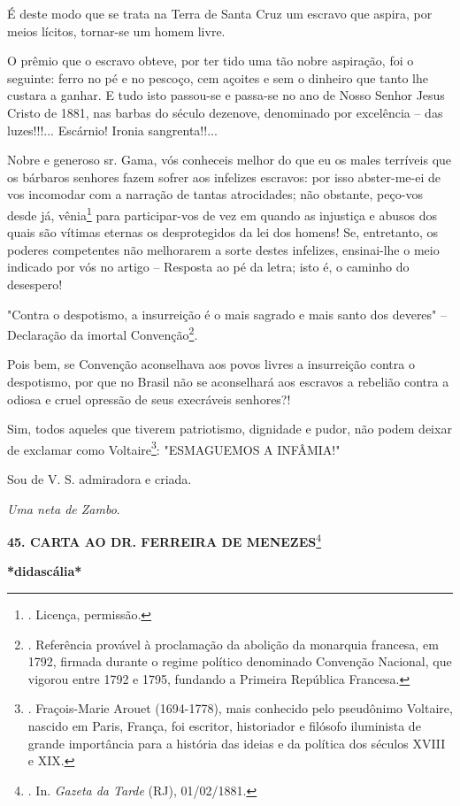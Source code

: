 É deste modo que se trata na Terra de Santa Cruz um escravo que aspira,
por meios lícitos, tornar-se um homem livre.

O prêmio que o escravo obteve, por ter tido uma tão nobre aspiração, foi
o seguinte: ferro no pé e no pescoço, cem açoites e sem o dinheiro que
tanto lhe custara a ganhar. E tudo isto passou-se e passa-se no ano de
Nosso Senhor Jesus Cristo de 1881, nas barbas do século dezenove,
denominado por excelência -- das luzes!!!... Escárnio! Ironia
sangrenta!!...

Nobre e generoso sr. Gama, vós conheceis melhor do que eu os males
terríveis que os bárbaros senhores fazem sofrer aos infelizes escravos:
por isso abster-me-ei de vos incomodar com a narração de tantas
atrocidades; não obstante, peço-vos desde já, vênia\footnote{. Licença,
  permissão.} para participar-vos de vez em quando as injustiça e abusos
dos quais são vítimas eternas os desprotegidos da lei dos homens! Se,
entretanto, os poderes competentes não melhorarem a sorte destes
infelizes, ensinai-lhe o meio indicado por vós no artigo -- Resposta ao
pé da letra; isto é, o caminho do desespero!

"Contra o despotismo, a insurreição é o mais sagrado e mais santo dos
deveres" -- Declaração da imortal Convenção\footnote{. Referência
  provável à proclamação da abolição da monarquia francesa, em 1792,
  firmada durante o regime político denominado Convenção Nacional, que
  vigorou entre 1792 e 1795, fundando a Primeira República Francesa.}.

Pois bem, se Convenção aconselhava aos povos livres a insurreição contra
o despotismo, por que no Brasil não se aconselhará aos escravos a
rebelião contra a odiosa e cruel opressão de seus execráveis senhores?!

Sim, todos aqueles que tiverem patriotismo, dignidade e pudor, não podem
deixar de exclamar como Voltaire\footnote{. Fraçois-Marie Arouet
  (1694-1778), mais conhecido pelo pseudônimo Voltaire, nascido em
  Paris, França, foi escritor, historiador e filósofo iluminista de
  grande importância para a história das ideias e da política dos
  séculos XVIII e XIX.}: "ESMAGUEMOS A INFÂMIA!"

Sou de V. S. admiradora e criada.

\emph{Uma neta de Zambo}.

\textbf{45. CARTA AO DR. FERREIRA DE MENEZES}\footnote{. In.
  \emph{Gazeta da Tarde} (RJ), 01/02/1881.}

\textbf{*didascália*}

